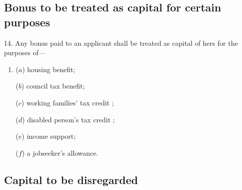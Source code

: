 \documentclass[12pt,a4paper]{article}
\begin{document}
%
%
%
%
%

\subsection[14. Bonus to be treated as capital for certain purposes]{Bonus to be treated as capital for certain purposes}

14.  Any bonus paid to an applicant shall be treated as capital of hers for the purposes of—
\begin{enumerate}\item[]
($a$) housing benefit;

($b$) council tax benefit;

($c$) 
working families' tax credit%
;

($d$) 
disabled person's tax credit%
;

($e$) income support;

($f$) a jobseeker’s allowance.
\end{enumerate}


\subsection[15. Capital to be disregarded]{Capital to be disregarded}
\end{document}
